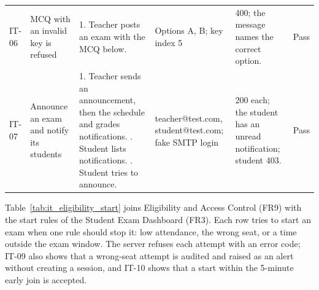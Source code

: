 {\begin{longtable}{@{}P{1.1cm}P{2.5cm}P{3.5cm}P{2.6cm}P{2.9cm}>{\centering\arraybackslash}p{1.8cm}@{}}
IT-06 & MCQ with an invalid key is refused & 1. Teacher posts an exam with the MCQ below. & Options A, B; key index 5  & 400; the message names the correct option. & Pass\\
IT-07 & Announce an exam and notify its students & 1. Teacher sends an announcement, then the schedule and grades notifications. . Student lists notifications. . Student tries to announce. & teacher@\allowbreak{}test.com, student@\allowbreak{}test.com; fake SMTP login  & 200 each; the student has an unread notification; student 403. & Pass\\
\end{longtable}}

Table~\ref{tab:it_eligibility_start} joins Eligibility and Access Control (FR9) with the start rules of the Student Exam Dashboard (FR3). Each row tries to start an exam when one rule should stop it: low attendance, the wrong seat, or a time outside the exam window. The server refuses each attempt with an error code; IT-09 also shows that a wrong-seat attempt is audited and raised as an alert without creating a session, and IT-10 shows that a start within the 5-minute early join is accepted.

